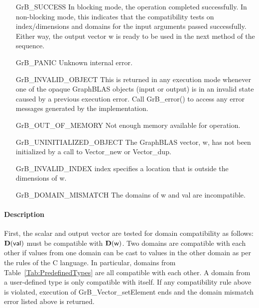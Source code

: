 \begin{itemize}[leftmargin=2.1in]
    \item[{\sf GrB\_SUCCESS}]         In blocking mode, the operation completed
    successfully. In non-blocking mode, this indicates that the compatibility 
    tests on index/dimensions and domains for the input arguments passed successfully. 
    Either way, the output vector {\sf w} is ready to be used in the next method of 
    the sequence.

    \item[{\sf GrB\_PANIC}]   Unknown internal error.
    
    \item[{\sf GrB\_INVALID\_OBJECT}] This is returned in any execution mode 
    whenever one of the opaque GraphBLAS objects (input or output) is in an invalid 
    state caused by a previous execution error.  Call {\sf GrB\_error()} to access 
    any error messages generated by the implementation.

    \item[{\sf GrB\_OUT\_OF\_MEMORY}]  Not enough memory available for operation.
    
    \item[{\sf GrB\_UNINITIALIZED\_OBJECT}]  The GraphBLAS vector, {\sf w}, has 
    not been initialized by a call to {\sf Vector\_new} or {\sf Vector\_dup}.
    
    \item[{\sf GrB\_INVALID\_INDEX}]  {\sf index} specifies a location 
    that is outside the dimensions of {\sf w}.

    \item[{\sf GrB\_DOMAIN\_MISMATCH}]     The domains of {\sf w} and {\sf val}
    are incompatible.
\end{itemize}

\paragraph{Description}

First, the scalar and output vector are tested for domain compatibility as follows:
$\mathbf{D}({\sf val})$ must be compatible with $\mathbf{D}({\sf w})$. Two domains 
are compatible with each other if values from one domain can be cast to values 
in the other domain as per the rules of the C language. In particular, domains 
from Table~\ref{Tab:PredefinedTypes} are all compatible with each other. A domain 
from a user-defined type is only compatible with itself. If any compatibility 
rule above is violated, execution of {\sf GrB\_Vector\_setElement} ends and 
the domain mismatch error listed above is returned.


